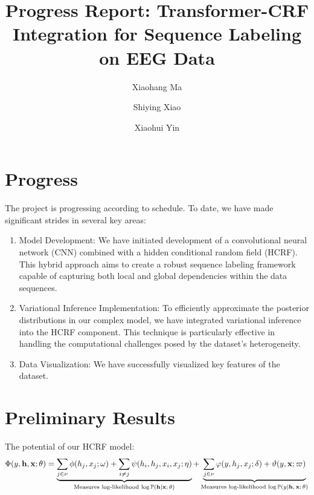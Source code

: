 \documentclass[10pt]{article}
\newcommand{\PP}{{\mathbb{P}}}
\newcommand{\hb}{\mathbf{h}}
\newcommand{\xb}{\mathbf{x}}
\begin{document}
\title{\vspace{-1cm} \Large
Progress Report: Transformer-CRF Integration for Sequence Labeling on EEG Data}

\author[1]{Xiaohang Ma}
\author[2]{Shiying Xiao}
\author[2]{Xiaohui Yin}


\date{\vspace{-1.3cm}}

\maketitle


\section{Progress}


The project is progressing according to schedule. To date, we have made
significant strides in several key areas:
\begin{enumerate}
\item Model Development:
We have initiated development of a convolutional neural network (CNN) combined
with a hidden conditional random field (HCRF). This hybrid approach aims to
create a robust sequence labeling framework capable of capturing both local
and global dependencies within the data sequences.
\item Variational Inference Implementation:
To efficiently approximate the posterior distributions in our complex model,
we have integrated variational inference into the HCRF component.
This technique is particularly effective in handling the computational
challenges posed by the dataset's heterogeneity.
\item Data Visualization:
We have successfully visualized key features of the dataset.
\end{enumerate}


\section{Preliminary Results}


The potential of our HCRF model:
\begin{equation*}
\Phi(y, \hb, \xb; \theta) = \underbrace{
\sum_{j \in \nu} \phi(h_j, x_j; \omega) +
\sum_{i \neq j} \psi(h_i, h_j, x_i, x_j; \eta)}_{
\textrm{Measures log-likelihood $\log\PP(\hb \vert \xb; \theta)$}}
+ \underbrace{
\sum_{j \in \nu} \varphi(y, h_j, x_j; \delta) + \vartheta(y, \xb; \varpi)
}_{
\textrm{Measures log-likelihood $\log\PP(y \vert \hb, \xb; \theta)$}
}
\end{equation*}
\end{document}
